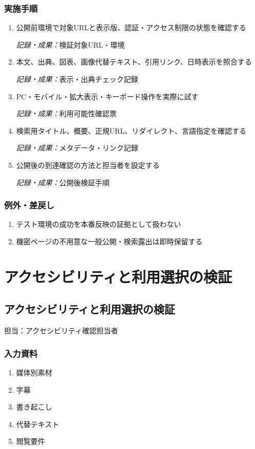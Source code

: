 \documentclass[a4paper,11pt]{article}
\begin{document}
\subsubsection*{実施手順}
\begin{enumerate}[leftmargin=2em,itemsep=0.65em]
\item 公開前環境で対象URLと表示版、認証・アクセス制限の状態を確認する\par\noindent\textit{記録・成果：}検証対象URL・環境\nobreak\smallskip
\item 本文、出典、図表、画像代替テキスト、引用リンク、日時表示を照合する\par\noindent\textit{記録・成果：}表示・出典チェック記録\nobreak\smallskip
\item PC・モバイル・拡大表示・キーボード操作を実際に試す\par\noindent\textit{記録・成果：}利用可能性確認票\nobreak\smallskip
\item 検索用タイトル、概要、正規URL、リダイレクト、言語指定を確認する\par\noindent\textit{記録・成果：}メタデータ・リンク記録\nobreak\smallskip
\item 公開後の到達確認の方法と担当者を設定する\par\noindent\textit{記録・成果：}公開後検証手順\nobreak\smallskip
\end{enumerate}
\subsubsection*{例外・差戻し}
\begin{enumerate}[leftmargin=2em,itemsep=0.35em]
\item テスト環境の成功を本番反映の証拠として扱わない
\item 機密ページの不用意な一般公開・検索露出は即時保留する
\end{enumerate}
\section{アクセシビリティと利用選択の検証}
\subsection{アクセシビリティと利用選択の検証}
\par 担当：アクセシビリティ確認担当者\par\medskip
\subsubsection*{入力資料}
\begin{enumerate}[leftmargin=2em,itemsep=0.35em]
\item 媒体別素材
\item 字幕
\item 書き起こし
\item 代替テキスト
\item 閲覧要件
\end{enumerate}
\end{document}
